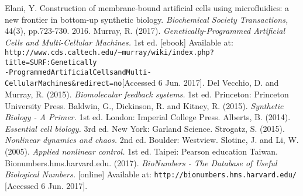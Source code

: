 \documentclass{article}
\begin{document}

\begin{thebibliography}{1}

	 Elani, Y. Construction of membrane-bound artificial cells using microfluidics: a new frontier in bottom-up synthetic biology. \textit{Biochemical Society Transactions,} 44(3), pp.723-730.  2016.
	 Murray, R. (2017). \textit{Genetically-Programmed Artificial Cells and Multi-Cellular Machines.} 1st ed. [ebook] Available at: \texttt{http://www.cds.caltech.edu/\textasciitilde murray/wiki/index.php?title=SURF:\textunderscore Genetically\\-Programmed\textunderscore Artificial\textunderscore Cells\textunderscore and\textunderscore Multi-Cellular\textunderscore Machines\&redirect=no}[Accessed 6 Jun. 2017].
	 Del Vecchio, D. and Murray, R. (2015). \textit{Biomolecular feedback systems.} 1st ed. Princeton: Princeton University Press.
  	 Baldwin, G., Dickinson, R. and Kitney, R. (2015). \textit{Synthetic Biology - A Primer.} 1st ed. London: Imperial College Press.
	 Alberts, B. (2014). \textit{Essential cell biology.} 3rd ed. New York: Garland Science.
	 Strogatz, S. (2015). \textit{Nonlinear dynamics and chaos.} 2nd ed. Boulder: Westview.
	 Slotine, J. and Li, W. (2005). \textit{Applied nonlinear control.} 1st ed. Taipei: Pearson education Taiwan.
	 Bionumbers.hms.harvard.edu. (2017). \textit{BioNumbers - The Database of Useful Biological Numbers.} [online] Available at: \texttt{http://bionumbers.hms.harvard.edu/} [Accessed 6 Jun. 2017].

\end{thebibliography}
\end{document}
